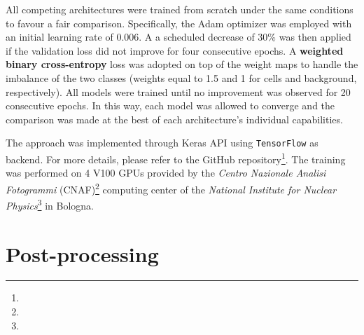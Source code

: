 All competing architectures were trained from scratch under the same conditions to favour a fair comparison.
Specifically, the Adam \cite{adam} optimizer was employed with an initial learning rate of 0.006. A a scheduled decrease of 30\% was then applied if the validation loss did not improve for four consecutive epochs. 
A \textbf{weighted binary cross-entropy} loss was adopted on top of the weight maps to handle the imbalance of the two classes (weights equal to 1.5 and 1 for cells and background, respectively).
All models were trained until no improvement was observed for 20 consecutive epochs. In this way, each model was allowed to converge and the comparison was made at the best of each architecture's individual capabilities.

The approach was implemented through Keras API \cite{keras} using \texttt{TensorFlow} \cite{tensorflow} as backend. For more details, please refer to the GitHub repository\footnote{\github}.
The training was performed on 4 V100 GPUs provided by the \textit{Centro Nazionale Analisi Fotogrammi} (CNAF)\footnote{\cnaf} computing center of the \textit{National Institute for Nuclear Physics}\footnote{\infn} in Bologna.


\section{Post-processing} \label{sec:post_processing}

